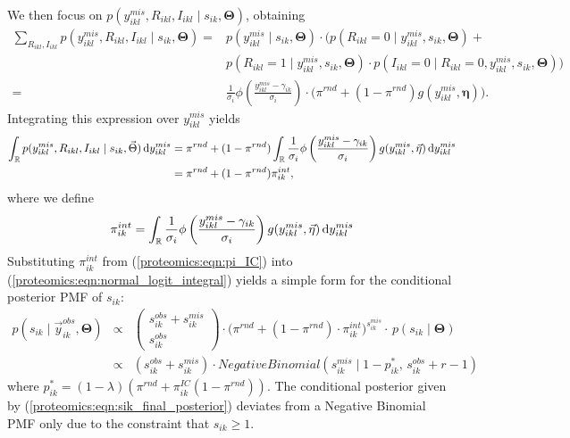 We then focus on $p(y_{ikl}^{mis}, R_{ikl},I_{ikl} \mid s_{ik}, \bm{\Theta})$, obtaining
\begin{align}
\nonumber
\sum_{R_{ikl},I_{ikl}} p(y_{ikl}^{mis}, R_{ikl},I_{ikl} \mid s_{ik}, \bm{\Theta})  =& 
p(y_{ikl}^{mis} \mid s_{ik}, \bm{\Theta}) \cdot \Big(
p(R_{ikl} = 0 \mid y_{ikl}^{mis}, s_{ik}, \bm{\Theta}) + \\
& p(R_{ikl} = 1 \mid y_{ikl}^{mis}, s_{ik}, \bm{\Theta})\cdot
p(I_{ikl} = 0 \mid R_{ikl}=0, y_{ikl}^{mis}, s_{ik}, \bm{\Theta}) \Big) \\
=& \frac{1}{\sigma_i} \phi\left( \frac{y_{ikl}^{mis} - \gamma_{ik}}{\sigma_{i}} \right) \cdot \Big( \pi^{rnd} + (1-\pi^{rnd}) g(y_{ikl}^{mis}, \bm \eta) \Big).
\end{align}
%
Integrating this expression over $y_{ikl}^{mis}$ yields
%
\begin{align}
\int_\Reals p(y_{ikl}^{mis}, R_{ikl},I_{ikl} \mid s_{ik}, \bm{\Theta}) \, \mathrm{d}y_{ikl}^{mis} &=
\pi^{rnd} +
(1-\pi^{rnd}) \int_\Reals \frac{1}{\sigma_i} \phi\left( \frac{y_{ikl}^{mis} - \gamma_{ik}}{\sigma_{i}} \right) g(y_{ikl}^{mis}, \bm \eta) \, \mathrm{d}y_{ikl}^{mis}  \label{proteomics:eqn:normal_logit_integral} \\
&= \pi^{rnd} + (1 - \pi^{rnd}) \pi^{int}_{ik},
\end{align}
%
where we define
\begin{equation}
\pi^{int}_{ik} = \int_\Reals \frac{1}{\sigma_i} \phi\left( \frac{y_{ikl}^{mis} - \gamma_{ik}}{\sigma_{i}} \right) g(y_{ikl}^{mis}, \bm \eta) \, \mathrm{d}y_{ikl}^{mis} \label{proteomics:eqn:pi_IC}
\end{equation}
Substituting $\pi^{int}_{ik}$ from (\ref{proteomics:eqn:pi_IC}) into (\ref{proteomics:eqn:normal_logit_integral}) yields a simple form for the conditional posterior PMF of $s_{ik}$: 
\begin{eqnarray}
\nonumber
p( s_{ik} \mid \vec{y}_{ik}^{obs}, \bm{\Theta} ) & \propto & 
\left(\begin{array}{c}
s_{ik}^{obs}+s_{ik}^{mis}\\
s_{ik}^{obs}
\end{array}\right) \cdot \Big( \pi^{rnd} + (1-\pi^{rnd}) \cdot \pi^{int}_{ik} \Big)^{s_{ik}^{mis}} \cdot \,  p(s_{ik} \mid \bm{\Theta}) \\
& \propto & 
(s_{ik}^{obs} + s_{ik}^{mis}) \cdot NegativeBinomial(s_{ik}^{mis} \mid 1-p_{ik}^*, \, s_{ik}^{obs} + r - 1) \label{proteomics:eqn:sik_final_posterior}
\end{eqnarray}
where $p_{ik}^* = (1-\lambda)(\pi^{rnd} + \pi_{ik}^{IC}(1-\pi^{rnd}))$.
%
The conditional posterior given by (\ref{proteomics:eqn:sik_final_posterior}) deviates from a Negative Binomial PMF only due to the constraint that $s_{ik} \geq 1$.

